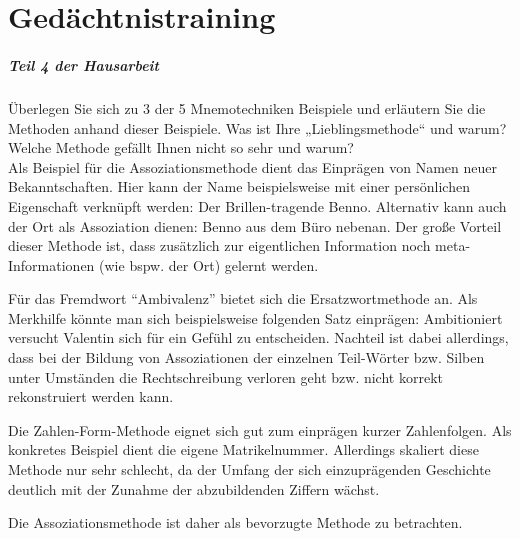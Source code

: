 %
\chapter{Gedächtnistraining}
\label{sec:gedaechtnistraining}

\paragraph{Teil 4 der Hausarbeit}
Überlegen Sie sich zu 3 der 5 Mnemotechniken Beispiele und erläutern Sie die Methoden anhand dieser Beispiele. Was ist Ihre „Lieblingsmethode“ und warum? Welche Methode gefällt Ihnen nicht so sehr und warum? \\[0.4em]

Als Beispiel für die Assoziationsmethode dient das Einprägen von Namen neuer Bekanntschaften. Hier kann der Name beispielsweise mit einer persönlichen Eigenschaft verknüpft werden: Der Brillen-tragende Benno.
Alternativ kann auch der Ort als Assoziation dienen: Benno aus dem Büro nebenan. Der große Vorteil dieser Methode ist, dass zusätzlich zur eigentlichen Information noch meta-Informationen (wie bspw. der Ort) gelernt werden.

Für das Fremdwort “Ambivalenz” bietet sich die Ersatzwortmethode an. Als Merkhilfe könnte man sich beispielsweise folgenden Satz einprägen: Ambitioniert versucht Valentin sich für ein Gefühl zu entscheiden. Nachteil ist dabei allerdings, dass bei der Bildung von Assoziationen der einzelnen Teil-Wörter bzw. Silben unter Umständen die Rechtschreibung verloren geht bzw. nicht korrekt rekonstruiert werden kann.

Die Zahlen-Form-Methode eignet sich gut zum einprägen kurzer Zahlenfolgen. Als konkretes Beispiel dient die eigene Matrikelnummer. Allerdings skaliert diese Methode nur sehr schlecht, da der Umfang der sich einzuprägenden Geschichte deutlich mit der Zunahme der abzubildenden Ziffern wächst.

Die Assoziationsmethode ist daher als bevorzugte Methode zu betrachten.
